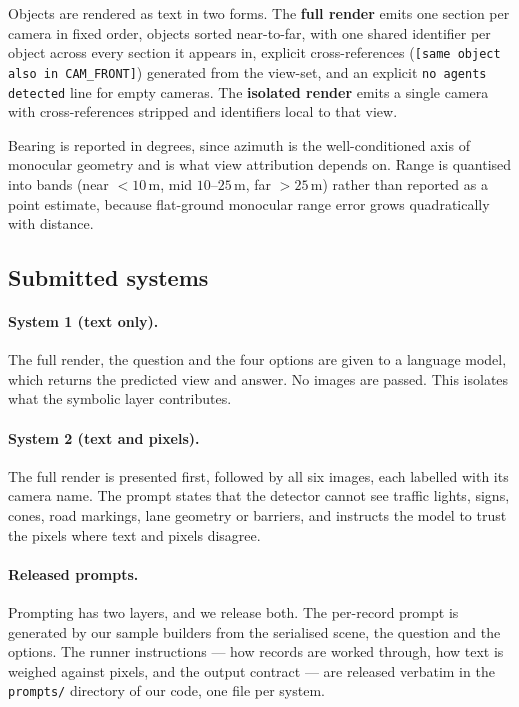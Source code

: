 \documentclass[11pt]{article}
\begin{document}
Objects are rendered as text in two forms. The \textbf{full render} emits one
section per camera in fixed order, objects sorted near-to-far, with one shared
identifier per object across every section it appears in, explicit
cross-references (\texttt{[same object also in CAM\_FRONT]}) generated from the
view-set, and an explicit \texttt{no agents detected} line for empty cameras.
The \textbf{isolated render} emits a single camera with cross-references
stripped and identifiers local to that view.

Bearing is reported in degrees, since azimuth is the well-conditioned axis of
monocular geometry and is what view attribution depends on. Range is quantised
into bands (near $<\!10$\,m, mid $10$--$25$\,m, far $>\!25$\,m) rather than
reported as a point estimate, because flat-ground monocular range error grows
quadratically with distance.

\subsection{Submitted systems}

\paragraph{System 1 (text only).} The full render, the question and the four
options are given to a language model, which returns the predicted view and
answer. No images are passed. This isolates what the symbolic layer
contributes.

\paragraph{System 2 (text and pixels).} The full render is presented first,
followed by all six images, each labelled with its camera name. The prompt
states that the detector cannot see traffic lights, signs, cones, road
markings, lane geometry or barriers, and instructs the model to trust the
pixels where text and pixels disagree.

\paragraph{Released prompts.} Prompting has two layers, and we release both.
The per-record prompt is generated by our sample builders from the serialised
scene, the question and the options. The runner instructions --- how records are
worked through, how text is weighed against pixels, and the output contract ---
are released verbatim in the \texttt{prompts/} directory of our code, one file
per system.
\end{document}
